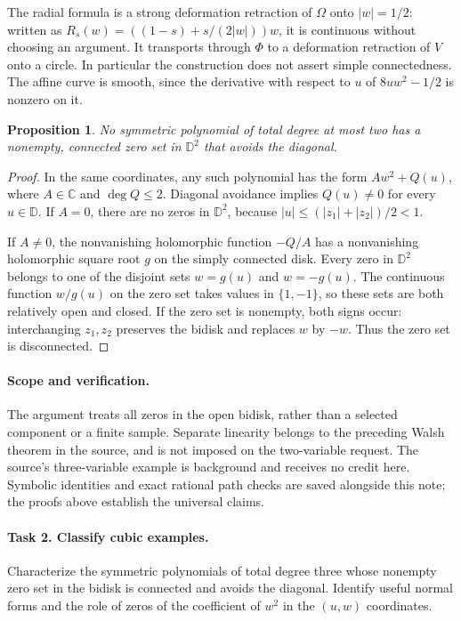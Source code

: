 \documentclass[11pt]{article}
\newcommand{\D}{\mathbb D}
\newcommand{\C}{\mathbb C}
\newtheorem{proposition}[theorem]{Proposition}
\begin{document}
The radial formula is a strong deformation retraction of $\Omega$
onto $|w|=1/2$: written as
$R_s(w)=((1-s)+s/(2|w|))w$, it is continuous without choosing an argument.
It transports through $\Phi$ to a deformation retraction of $V$ onto a
circle. In particular the construction does not assert simple connectedness.
The affine curve is smooth, since the derivative with respect to $u$ of
$8uw^2-1/2$ is nonzero on it.

\begin{proposition}
No symmetric polynomial of total degree at most two has a nonempty,
connected zero set in $\D^2$ that avoids the diagonal.
\end{proposition}

\begin{proof}
In the same coordinates, any such polynomial has the form
$A w^2+Q(u)$, where $A\in\C$ and $\deg Q\le2$.
Diagonal avoidance implies $Q(u)\ne0$ for every $u\in\D$.
If $A=0$, there are no zeros in $\D^2$, because
$|u|\le(|z_1|+|z_2|)/2<1$.

If $A\ne0$, the nonvanishing holomorphic function $-Q/A$ has a
nonvanishing holomorphic square root $g$ on the simply connected disk.
Every zero in $\D^2$ belongs to one of the disjoint sets $w=g(u)$ and
$w=-g(u)$. The continuous function $w/g(u)$ on the zero set takes values
in $\{1,-1\}$, so these sets are both relatively open and closed.
If the zero set is nonempty, both signs occur: interchanging $z_1,z_2$
preserves the bidisk and replaces $w$ by $-w$. Thus the zero set is
disconnected.
\end{proof}

\paragraph{Scope and verification.}
The argument treats all zeros in the open bidisk, rather than a selected
component or a finite sample. Separate linearity belongs to the preceding
Walsh theorem in the source, and is not imposed on the two-variable request.
The source's three-variable example is background and receives no credit here.
Symbolic identities and exact rational path checks are saved alongside
this note; the proofs above establish the universal claims.

\paragraph{Task 2. Classify cubic examples.}
Characterize the symmetric polynomials of total degree three whose
nonempty zero set in the bidisk is connected and avoids the diagonal.
Identify useful normal forms and the role of zeros of the coefficient
of $w^2$ in the $(u,w)$ coordinates.
\end{document}
